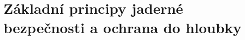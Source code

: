 \section[Jaderná bezpečnost \& ochrana do hloubky]{Základní principy jaderné bezpečnosti a ochrana do hloubky}

